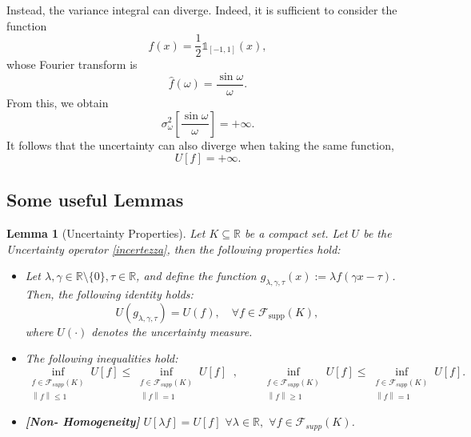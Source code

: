\documentclass[preprint,hidelinks,authoryear]{elsarticle}
\newtheorem{Lemma}[Thm]{Lemma}
\theoremstyle{plain}
\theoremstyle{definition}
\theoremstyle{remark}
\begin{document}
Instead, the variance integral can diverge. Indeed, it is sufficient to consider the function
$$
f(x) = \frac{1}{2} \mathds{1}_{[-1,1]}(x),
$$  
whose Fourier transform is  
$$
\hat{f}(\omega) = \frac{\sin{\omega}}{\omega}.
$$  
From this, we obtain  
$$
\sigma_{\omega}^2 \left[\frac{\sin{\omega}}{\omega}\right] = +\infty.
$$  
It follows that the uncertainty can also diverge when taking the same function,  
$$
U\left[f\right] = +\infty.
$$

\subsection{Some useful Lemmas}


\begin{Lemma}[Uncertainty Properties]  
\label{lemma:uncertaintyprop}
Let $ K \subseteq \mathbb{R} $ be a compact set. Let $ U $ be the Uncertainty operator \eqref{incertezza}, then the following properties hold:  
\begin{itemize}  
    \item[(i)]  Let $ \lambda, \gamma \in \mathbb{R} \setminus \{0\}, \tau \in \mathbb{R} $, and define the function $ g_{\lambda,\gamma,\tau}(x) := \lambda f(\gamma x-\tau) $.  
Then, the following identity holds:
\begin{equation}
    U(g_{\lambda,\gamma,\tau}) = U(f), \quad \forall f \in \mathcal{F}_{\text{supp}}(K),
    \label{eq:supportonormalizzazione}
\end{equation}
where $ U(\cdot) $ denotes the uncertainty measure.
    \item[(ii)]  The following inequalities hold:
    \begin{equation}  
        \inf_{\substack{f \in \mathcal{F}_{supp}(K) \\ \left  \| f  \right\| \leq 1}}U[f] \leq \inf_{\substack{f \in \mathcal{F}_{supp}(K) \\ \left  \| f  \right\| = 1}}U[f] \; \;, \quad \quad\inf_{\substack{f \in \mathcal{F}_{supp}(K) \\ \left  \| f  \right\| \geq 1}}U[f] \leq \inf_{\substack{f \in \mathcal{F}_{supp}(K) \\ \left  \| f  \right\| = 1}}U[f]. 
\label{elencoincertezzesuF}  
    \end{equation}
    \item[(iii)] \textbf{[Non- Homogeneity]} $ U[\lambda f] = U[f] $ \; $ \forall \lambda \in \mathbb{R}, $ \; $ \forall f \in \mathcal{F}_{supp}(K) $.
\end{itemize}  
\end{Lemma}
\end{document}
